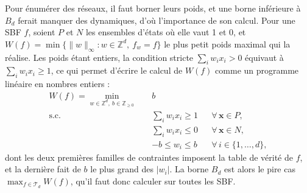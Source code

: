 \documentclass[12pt, a4paper]{article}
\begin{document}
Pour énumérer des réseaux, il faut borner leurs poids, et une borne inférieure à $B_d$ ferait manquer des dynamiques, d'où l'importance de son calcul.
Pour une SBF $f$, soient $P$ et $N$ les ensembles d'états où elle vaut 1 et 0, et $W(f) = \min\{ \|w\|_\infty : w \in \mathbb{Z}^d,\ f_w = f \}$ le plus petit poids maximal qui la réalise.
Les poids étant entiers, la condition stricte $\sum_i w_i x_i > 0$ équivaut à $\sum_i w_i x_i \ge 1$, ce qui permet d'écrire le calcul de $W(f)$ comme un programme linéaire en nombres entiers :
\begin{equation}
\begin{aligned}
W(f) = \min_{w \in \mathbb{Z}^d,\ b \in \mathbb{Z}_{\ge 0}}\quad & b\\
\text{s.c.}\quad
& \textstyle\sum_i w_i x_i \ge 1 && \forall\, \mathbf{x} \in P,\\
& \textstyle\sum_i w_i x_i \le 0 && \forall\, \mathbf{x} \in N,\\
& -b \le w_i \le b && \forall\, i \in \{1,\dots,d\},
\end{aligned}
\end{equation}
dont les deux premières familles de contraintes imposent la table de vérité de $f$, et la dernière fait de $b$ le plus grand des $|w_i|$.
La borne $B_d$ est alors le pire cas $\max_{f \in \mathcal{T}_d} W(f)$, qu'il faut donc calculer sur toutes les SBF.
\end{document}
